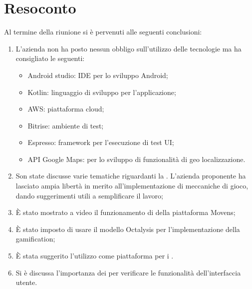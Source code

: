 \documentclass[a4paper, oneside, openany, dvipsnames, table]{article}
\begin{document}
\section{Resoconto}
Al termine della riunione si è pervenuti alle seguenti conclusioni:	
\begin{enumerate}
	\item L'azienda non ha posto nessun obbligo sull'utilizzo delle tecnologie ma ha consigliato le seguenti:
		\begin{itemize}
			\item Android studio: IDE per lo sviluppo Android;
			\item Kotlin: linguaggio di sviluppo per l'applicazione;
			\item AWS: piattaforma cloud;
			\item Bitrise: ambiente di test;
			\item Espresso: framework per l'esecuzione di test UI;
			\item API Google Maps: per lo sviluppo di funzionalità di geo localizzazione.
			
		\end{itemize}
	\item  Son state discusse varie tematiche riguardanti la . L'azienda proponente ha lasciato ampia libertà in merito all'implementazione di meccaniche di gioco, dando suggerimenti utili a semplificare il lavoro;
	\item È stato mostrato a video il funzionamento di della piattaforma Movens;
	\item È stato imposto di usare il modello Octalysis per l'implementazione della gamification;
	\item È stata suggerito l'utilizzo  come piattaforma per i .
	\item Si è discussa l'importanza dei  per verificare le funzionalità dell'interfaccia utente.  
\end{enumerate}
\newpage
\end{document}
